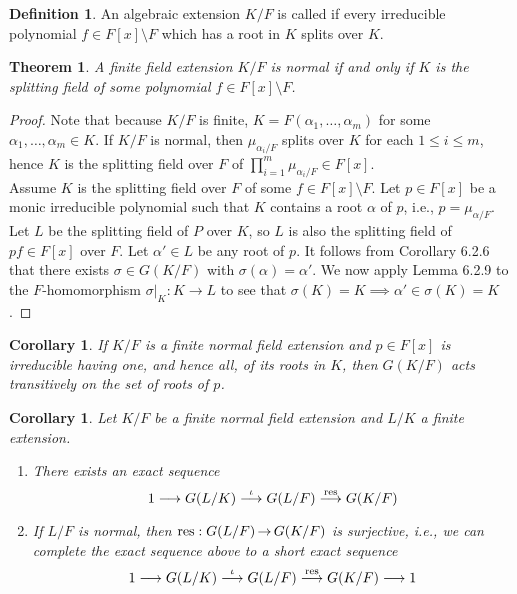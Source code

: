 \documentclass[11pt]{book}
\newcounter{counter}
\newtheorem{theorem}[counter]{Theorem}   \newtheorem*{theorem*}{Theorem}   \newtheorem{lemma}[counter]{Lemma}   \newtheorem{corollary}[counter]{Corollary}
\theoremstyle{definition}   \newtheorem{defn}[counter]{Definition} %
\newcommand{\bs}{\setminus}   \newcommand{\A}{\mathcal{A}}   \newcommand{\sy}{\textnormal{Syl}}   \newcommand{\size}[1]{\left| #1 \right|}
\DeclareMathOperator{\ra}{\rightarrow}   \DeclareMathOperator{\Poly}{\mathbf{P}}   \DeclareMathOperator{\spn}{\textnormal{span}}   \DeclareMathOperator{\aut}{\textnormal{Aut}}
\newcommand{\vs}{\vspace{8pt}}
\numberwithin{counter}{chapter}
\begin{document}
\begin{defn}
An algebraic extension $K/F$ is called  if every irreducible polynomial $f \in F[x] \bs F$ which has a root in $K$ splits over $K$. 
\end{defn}

\vs

\begin{theorem}
A finite field extension $K/F$ is normal if and only if $K$ is the splitting field of some polynomial $f \in F[x] \bs F$. 
\end{theorem}

\begin{proof}
Note that because $K/F$ is finite, $K = F(\alpha_1,\dots,\alpha_m)$ for some $\alpha_1,\dots,\alpha_m \in K$. If $K/F$ is normal, then $\mu_{\alpha_i/F}$ splits over $K$ for each $1 \leq i \leq m$, hence $K$ is the splitting field over $F$ of $\prod_{i=1}^m \mu_{\alpha_i/F} \in F[x]$. \\

Assume $K$ is the splitting field over $F$ of some $f \in F[x] \bs F$. Let $p \in F[x]$ be a monic irreducible polynomial such that $K$ contains a root $\alpha$ of $p$, i.e., $p = \mu_{\alpha/F}$. Let $L$ be the splitting field of $P$ over $K$, so $L$ is also the splitting field of $pf \in F[x]$ over $F$. Let $\alpha' \in L$ be any root of $p$. It follows from Corollary 6.2.6 that there exists $\sigma \in G(K/F)$ with $\sigma(\alpha) = \alpha'$. We now apply Lemma 6.2.9 to the $F$-homomorphism $\sigma|_K : K \ra L$ to see that $\sigma(K) = K \implies \alpha' \in \sigma(K) = K$. 
\end{proof}

\vs

\begin{corollary}
If $K/F$ is a finite normal field extension and $p \in F[x]$ is irreducible having one, and hence all, of its roots in $K$, then $G(K/F)$ acts transitively on the set of roots of $p$. 
\end{corollary}

\vs

\begin{corollary}
Let $K/F$ be a finite normal field extension and $L/K$ a finite extension.
\begin{enumerate}
\item[(a)] There exists an exact sequence 
	\[1 \longrightarrow G(L/K) \overset{\iota}{\longrightarrow} G(L/F) \overset{\textnormal{res}}{\longrightarrow} G(K/F) \]

\item[(b)] If $L/F$ is normal, then $\tn{res} : G(L/F) \ra G(K/F)$ is surjective, i.e., we can complete the exact sequence above to a short exact sequence
\[1 \longrightarrow G(L/K) \overset{\iota}{\longrightarrow} G(L/F) \overset{\textnormal{res}}{\longrightarrow} G(K/F) \longrightarrow 1 \]
\end{enumerate}
\end{corollary}
\end{document}
